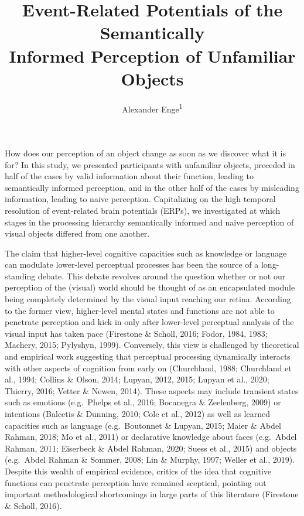 \documentclass[
  english,
  man,11pt,floatsintext]{apa7}
\title{Event-Related Potentials of the Semantically\\
Informed Perception of Unfamiliar Objects}
\author{Alexander Enge\textsuperscript{1}}
\date{}
\affiliation{\vspace{0.5cm}\textsuperscript{1} Humboldt-Universität zu Berlin}
\begin{document}
\maketitle

How does our perception of an object change as soon as we discover what it is for? In this study, we presented participants with unfamiliar objects, preceded in half of the cases by valid information about their function, leading to semantically informed perception, and in the other half of the cases by misleading information, leading to naive perception. Capitalizing on the high temporal resolution of event-related brain potentials (ERPs), we investigated at which stages in the processing hierarchy semantically informed and naive perception of visual objects differed from one another.

The claim that higher-level cognitive capacities such as knowledge or language can modulate lower-level perceptual processes has been the source of a long-standing debate. This debate revolves around the question whether or not our perception of the (visual) world should be thought of as an encapsulated module being completely determined by the visual input reaching our retina. According to the former view, higher-level mental states and functions are not able to penetrate perception and kick in only after lower-level perceptual analysis of the visual input has taken pace (Firestone \& Scholl, 2016; Fodor, 1984, 1983; Machery, 2015; Pylyshyn, 1999). Conversely, this view is challenged by theoretical and empirical work suggesting that perceptual processing dynamically interacts with other aspects of cognition from early on (Churchland, 1988; Churchland et al., 1994; Collins \& Olson, 2014; Lupyan, 2012, 2015; Lupyan et al., 2020; Thierry, 2016; Vetter \& Newen, 2014). These aspects may include transient states such as emotions (e.g.~Phelps et al., 2016; Bocanegra \& Zeelenberg, 2009) or intentions (Balcetis \& Dunning, 2010; Cole et al., 2012) as well as learned capacities such as language (e.g.~Boutonnet \& Lupyan, 2015; Maier \& Abdel Rahman, 2018; Mo et al., 2011) or declarative knowledge about faces (e.g.~Abdel Rahman, 2011; Eiserbeck \& Abdel Rahman, 2020; Suess et al., 2015) and objects (e.g.~Abdel Rahman \& Sommer, 2008; Lin \& Murphy, 1997; Weller et al., 2019). Despite this wealth of empirical evidence, critics of the idea that cognitive functions can penetrate perception have remained sceptical, pointing out important methodological shortcomings in large parts of this literature (Firestone \& Scholl, 2016).
\end{document}
